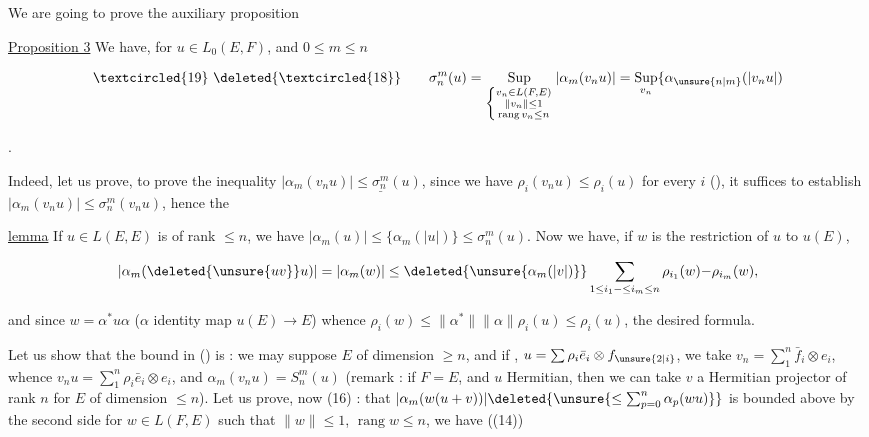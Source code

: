 We are going to prove the auxiliary proposition

\uline{Proposition 3} We have, for $u\in L_0(E,F)$, and $0\leq m\leq n$

\[
\begin{array}{@{}l@{\qquad}l@{}}
\textcircled{19}\ \deleted{\textcircled{18}} &
\displaystyle \sigma_n^m(u)=\operatorname*{Sup}_{\left\{\substack{v_n\in L(F,E)\\\lVert v_n\rVert\leq1\\\operatorname{rang}v_n\leq n}\right.}|\alpha_m(v_nu)|=\operatorname*{Sup}_{v_n}\{\alpha_{\unsure{n|m}}(|v_nu|)
\end{array}
\]

.

Indeed, let us prove,   to prove the inequality  $|\alpha_m(v_nu)|\leq\underline{\sigma_n^m}(u)$, since we have $\rho_i(v_nu)\leq\rho_i(u)$ for every $i$ (\unsure{---}), it suffices to establish $|\alpha_m(v_nu)|\leq\sigma_n^m(v_nu)$, hence the

\uline{lemma} If $u\in L(E,E)$ is of rank $\leq n$, we have $|\alpha_m(u)|\leq\{\alpha_m(|u|)\}\leq\sigma_n^m(u)$. Now we have, if $w$ is the restriction of $u$ to $u(E)$, 

\[
|\alpha_m(\deleted{\unsure{uv}}u)|=|\alpha_m(w)|\leq\deleted{\unsure{\alpha_m(|v|)}}\sum_{1\leq i_1\mathord{-}\leq i_m\leq n}\rho_{i_1}(w)\mathord{-}\rho_{i_m}(w),
\]

and since  $w=\alpha^*u\alpha$ ($\alpha$ identity map $u(E)\longrightarrow E$) whence $\rho_i(w)\leq\lVert\alpha^*\rVert\lVert\alpha\rVert\rho_i(u)\leq\rho_i(u)$, the desired formula.


 Let us show that the bound in () is  : we may suppose $E$ of dimension $\geq n$,  and if , $u=\sum\rho_i\bar e_i\otimes f_{\unsure{2|i}}$, we take $v_n=\sum_1^n\bar f_i\otimes e_i$, whence $v_nu=\sum_1^n\rho_i\bar e_i\otimes e_i$, and $\alpha_m(v_nu)=S_n^m(u)$ (remark : if $F=E$, and $u$ Hermitian, then we can take $v$ a Hermitian projector of rank $n$ for $E$ of dimension $\leq n$).
Let us prove, now (16) :   that $|\alpha_m(w(u+v))|\deleted{\unsure{\leq\sum_{p=0}^{n}\alpha_p(wu)}}$ is bounded above by the second side for  $w\in L(F,E)$ such that $\lVert w\rVert\leq1$, $\operatorname{rang}w\leq n$,   we have ((14))


